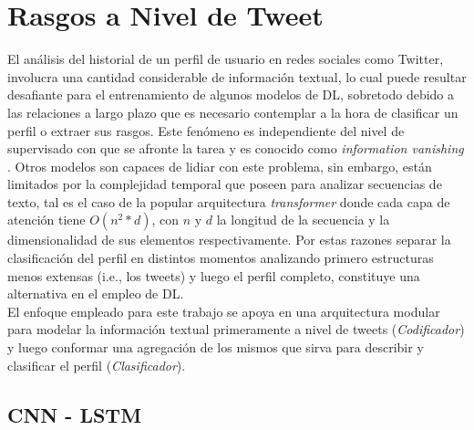 	\section{Rasgos a Nivel de Tweet}
	
	El análisis del historial de un perfil de usuario en redes sociales como Twitter, involucra una cantidad considerable de información textual, lo cual puede resultar desafiante para el entrenamiento de algunos modelos de DL, sobretodo debido a las relaciones a largo plazo que es necesario contemplar a la hora de clasificar un perfil o extraer sus rasgos.	
	Este fenómeno es independiente del nivel de supervisado con que se afronte la tarea y es conocido como \textit{information vanishing} \citep{hochreiter2001gradient}. Otros modelos son capaces de lidiar con este problema, sin embargo, están limitados por la complejidad temporal que poseen para analizar secuencias de texto, tal es el caso de la popular arquitectura \textit{transformer} donde cada capa de atención tiene  $O (n^2*d)$, con $n \text{ y } d$ la longitud de la secuencia y la dimensionalidad de sus elementos respectivamente. 
	Por estas razones separar la clasificación del perfil en distintos momentos analizando primero estructuras menos extensas (i.e., los tweets) y luego el perfil completo, constituye una alternativa en el empleo de DL.\\
	El enfoque empleado para este trabajo se apoya en una arquitectura modular para modelar la información textual primeramente a nivel de tweets  (\textit{Codificador}) y luego conformar una agregación de los mismos que sirva para describir y clasificar el perfil (\textit{Clasificador}).
	
	\subsection{CNN - LSTM}~\label{cnn-lstm}
	
